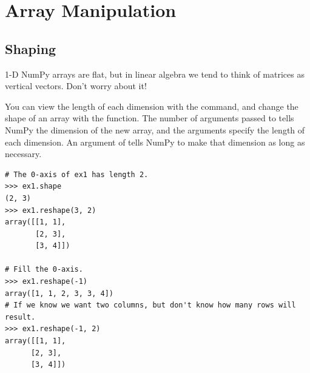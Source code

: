 \section*{Array Manipulation}

\subsection*{Shaping}

\begin{info}
1-D NumPy arrays are flat, but in linear algebra we tend to think of matrices as vertical vectors.
Don't worry about it!
\end{info}


You can view the length of each dimension with the  command, and change the shape of an array with the  function. 
The number of arguments passed to  tells NumPy the dimension of the new array, and the arguments specify the length of each dimension. 
An argument of  tells NumPy to make that dimension as long as necessary.
\begin{lstlisting}
# The 0-axis of ex1 has length 2.
>>> ex1.shape
(2, 3)
>>> ex1.reshape(3, 2)
array([[1, 1],
       [2, 3],
       [3, 4]])

# Fill the 0-axis.
>>> ex1.reshape(-1)
array([1, 1, 2, 3, 3, 4])
# If we know we want two columns, but don't know how many rows will result.
>>> ex1.reshape(-1, 2)
array([[1, 1],
      [2, 3],
      [3, 4]])
\end{lstlisting}


